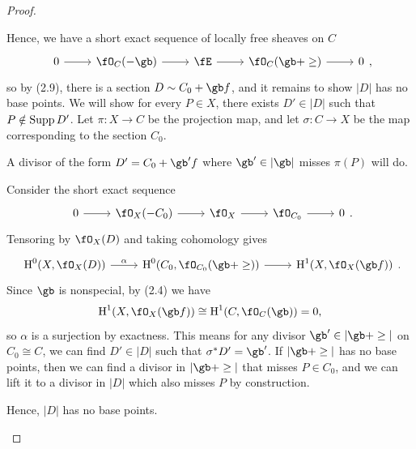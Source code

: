 \documentclass[a4paper]{article}
\begin{document}
\begin{enumerate} [label=\textbf{\arabic*.}, leftmargin=0em]
\begin{proof}
\begin{itemize} [leftmargin=0cm]
                        Hence, we have a short exact sequence of locally free sheaves on $C$
                        \[ \begin{tikzcd}
                                0 \arrow[r] & \fO_C(-\gb) \arrow[r] & \fE \arrow[r] & \fO_C(\gb + \ge) \arrow[r] & 0
                            \end{tikzcd} , \]
                        so by (2.9), there is a section $D \sim C_0 + \gb f$, and it remains to show $|D|$ has no base points.
                        We will show for every $P \in X$, there exists $D' \in |D|$ such that $P \notin \operatorname{Supp}{D'}$.
                        Let $\pi : X \to C$ be the projection map, and let $\sigma : C \to X$ be the map corresponding to the section $C_0$.

                         A divisor of the form $D' = C_0 + \gb'f$ where $\gb' \in |\gb|$ misses $\pi(P)$ will do.

                         Consider the short exact sequence
                        \[ \begin{tikzcd}
                                0 \arrow[r] & \fO_X(-C_0) \arrow[r] & \fO_X \arrow[r] & \fO_{C_0} \arrow[r] & 0
                            \end{tikzcd} . \]
                        Tensoring by $\fO_X(D)$ and taking cohomology gives
                        \[ \begin{tikzcd}
                                {\cH^0(X, \fO_X(D))} \arrow[r, "\alpha"] & {\cH^0(C_0, \fO_{C_0}(\gb + \ge))} \arrow[r] & {\cH^1(X, \fO_X(\gb f))}
                            \end{tikzcd}. \]
                        Since $\gb$ is nonspecial, by (2.4) we have
                        \begin{equation*}
                            \cH^1(X, \fO_X(\gb f)) \cong \cH^1(C, \fO_C(\gb)) = 0,
                        \end{equation*}
                        so $\alpha$ is a surjection by exactness.
                        This means for any divisor $\gb' \in |\gb + \ge|$ on $C_0 \cong C$, we can find $D' \in |D|$ such that $\sigma^*D' = \gb'$.
                        If $|\gb + \ge|$ has no base points, then we can find a divisor in $|\gb + \ge|$ that misses $P \in C_0$, and we can lift it to a divisor in $|D|$ which also misses $P$ by construction.

                        Hence, $|D|$ has no base points.


\end{itemize}
\end{proof}
\end{enumerate}
\end{document}
